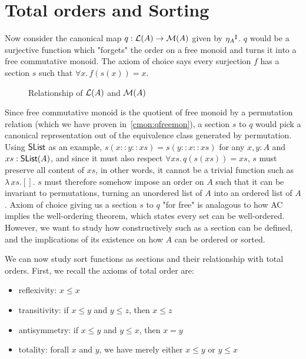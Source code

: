 \section{Total orders and Sorting}
\label{sec:sorting}

Now consider the canonical map $q : \mathcal{L}(A) \to \mathcal{M}(A)$ given by ${\eta_A}^{\sharp}$. $q$ would be a surjective
function which "forgets" the order on a free monoid and turns it into a free commutative monoid.
The axiom of choice says every surjection $f$ has a section $s$ such that $\forall x.\, f(s(x)) = x$.

\begin{figure}[H]
    \centering
    \caption{Relationship of $\mathcal{L}(A)$ and $\mathcal{M}(A)$}
    \label{fig:enter-label}
\end{figure}

Since free commutative monoid is the quotient of free monoid by a permutation relation
(which we have proven in~\ref{cmon:qfreemon}), a section $s$ to $q$ would pick a canonical representation
out of the equivalence class generated by permutation.
Using $\operatorname{\mathsf{SList}}$ as an example, $s(x :: y :: xs) = s(y :: x :: xs)$ for any $x, y : A$ and $xs : \operatorname{\mathsf{SList}}(A)$,
and since it must also respect $\forall xs.\,q(s(xs)) = xs$, $s$ must preserve all content of $xs$,
in other words, it cannot be a trivial function such as $\lambda\,xs. []$.
$s$ must therefore
somehow impose an order on $A$ such that it can be invariant to permutations, turning an unordered list of $A$
into an ordered list of $A$. Axiom of choice giving us a section $s$ to $q$ "for free" is analagous to how
AC implies the well-ordering theorem, which states every set can be well-ordered. However, we want to study
how constructively such as a section can be defined, and the implications of its existence on how $A$
can be ordered or sorted.

We can now study sort functions as sections and their relationship with total orders.
First, we recall the axioms of total order are:
\begin{itemize}
    \item reflexivity: $x \leq x$
    \item transitivity: if $x \leq y$ and $y \leq z$, then $x \leq z$
    \item antisymmetry: if $x \leq y$ and $y \leq x$, then $x = y$
    \item totality: forall $x$ and $y$, we have merely either $x \leq y$ or $y \leq x$ 
\end{itemize}

